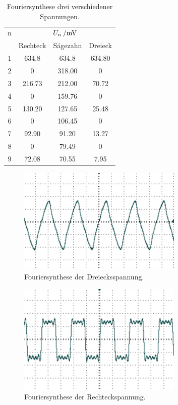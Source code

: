 \begin{table}
	\centering
	\begin{tabular}{cccc}	
	\toprule
\multicolumn{1}{c}{n} & \multicolumn{3}{c}{$U_n\:/\si{\milli{\volt}}$}\\
	{} & {Rechteck} & {Sägezahn} & {Dreieck}\\
	\midrule
 1 & 634.8  & 634.8  & 634.80\\
 2 &   0    & 318.00 &   0\\
 3 & 216.73 & 212.00 &  70.72\\
 4 &   0    & 159.76 &   0\\
 5 & 130.20 & 127.65 &  25.48\\
 6 &   0    & 106.45 &   0\\
 7 &  92.90 &  91.20 &  13.27\\
 8 &   0    &  79.49 &   0\\
 9 &  72.08 &  70.55 &  7.95\\
	\bottomrule
	\end{tabular}
	\caption{Fouriersynthese drei verschiedener Spannungen.}
	\label{tab:FS}
\end{table}






\begin{figure}
	\centering
		\includegraphics[width=0.7\textwidth]{Bilder/1-9_DE.pdf}		
\caption{Fouriersynthese der Dreiecksspannung.}
	\label{fig:1-9_DE}
\end{figure}






\begin{figure}
	\centering
		\includegraphics[width=0.7\textwidth]{Bilder/1-9_RE.pdf}		
\caption{Fouriersynthese der Rechteckspannung.}
	\label{fig:1-9_RE}
\end{figure}




